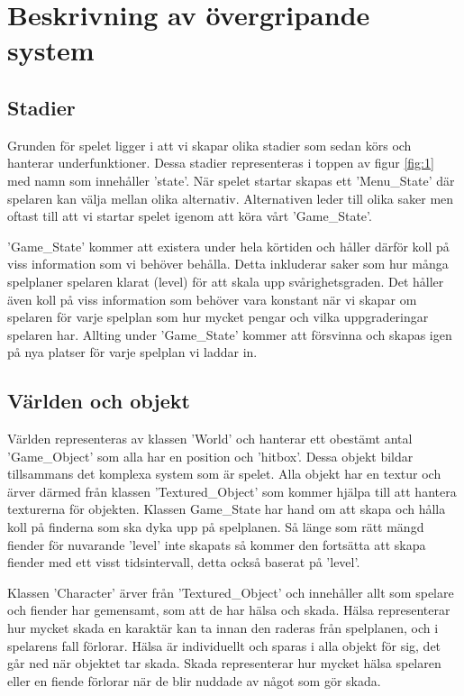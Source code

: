 \documentclass{TDP005mall}
\begin{document}
\section{Beskrivning av övergripande system}

\subsection{Stadier}
Grunden för spelet ligger i att vi skapar olika stadier som sedan körs och hanterar underfunktioner. Dessa stadier representeras i toppen av figur \ref{fig:1} med namn som innehåller 'state'. När spelet startar skapas ett 'Menu\_State' där spelaren kan välja mellan olika alternativ. Alternativen leder till olika saker men oftast till att vi startar spelet igenom att köra vårt 'Game\_State'. 

'Game\_State' kommer att existera under hela körtiden och håller därför koll på viss information som vi behöver behålla. Detta inkluderar saker som hur många spelplaner spelaren klarat (level) för att skala upp svårighetsgraden. Det håller även koll på viss information som behöver vara konstant när vi skapar om spelaren för varje spelplan som hur mycket pengar och vilka uppgraderingar spelaren har. Allting under 'Game\_State' kommer att försvinna och skapas igen på nya platser för varje spelplan vi laddar in.

\subsection{Världen och objekt}
Världen representeras av klassen 'World' och hanterar ett obestämt antal 'Game\_Object' som alla har en position och 'hitbox'. Dessa objekt bildar tillsammans det komplexa system som är spelet. Alla objekt har en textur och ärver därmed från klassen 'Textured\_Object' som kommer hjälpa till att hantera texturerna för objekten. Klassen Game\_State har hand om att skapa och hålla koll på finderna som ska dyka upp på spelplanen. Så länge som rätt mängd fiender för nuvarande 'level' inte skapats så kommer den fortsätta att skapa fiender med ett visst tidsintervall, detta också baserat på 'level'.

Klassen 'Character' ärver från 'Textured\_Object' och innehåller allt som spelare och fiender har gemensamt, som att de har hälsa och skada. Hälsa representerar hur mycket skada en karaktär kan ta innan den raderas från spelplanen, och i spelarens fall förlorar. Hälsa är individuellt och sparas i alla objekt för sig, det går ned när objektet tar skada. Skada representerar hur mycket hälsa spelaren eller en fiende förlorar när de blir nuddade av något som gör skada.
\end{document}

